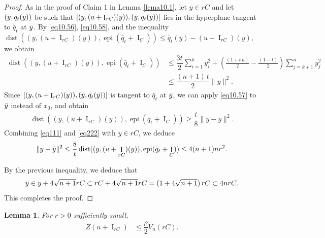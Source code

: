 \documentclass[11pt]{article}
\newtheorem{lema}[teo]{Lemma}
\theoremstyle{definition} %
\DeclareMathOperator{\I}{I}
\DeclareMathOperator{\epi}{epi}
\DeclareMathOperator{\dist}{dist}
\begin{document}
\begin{proof}
As in the proof of Claim 1 in Lemma \ref{lema10.1}, let $y\in rC$ and let $(\Bar{y}, \bar{q}_t(\Bar{y}))$ be such that $[(y,(u+\I_{rC})(y)), (\Bar{y}, \bar{q}_t(\Bar{y}))]$ lies in the hyperplane tangent to $\bar{q}_t$ at $\Bar{y}$. By \eqref{eq10.56}, \eqref{eq10.58}, and the inequality $\dist((y,(u+\I_{rC})(y)), \epi (\bar{q}_t+ \I_C))\leq \bar{q}_t(y)-(u+\I_{rC})(y)$, we obtain 
\begin{align}
 \nonumber\dist((y,(u+\I_{rC})(y)), \epi (\bar{q}_t+ \I_C)) & \leq    \dfrac{3t}{2} \sum_{i=1}^k y_i^2 + \left(\frac{(1+t\, n)}{2}  - \frac{(1-t)}{2}\right)\sum_{j=k+1}^ny_j^2\\
 \label{eq111}& \leq \dfrac{(n+1)\, t}{2}\|y\|^2.
\end{align}
Since $[(y,(u+\I_{rC}) (y)), (\Bar{y}, \bar{q}_t(\Bar{y}))]$ is tangent to $\bar{q}_t$ at $\Bar{y}$, we can apply \eqref{eq10.57} to $\Bar{y}$ instead of $x_0$, and obtain
\begin{align}\label{eq222}
\dist((y,(u+\I_{rC}) (y)), \epi (\bar{q}_t+ \I_C)) \geq \dfrac{t}{8}\|y-\bar{y}\|^2.    
\end{align}
Combining \eqref{eq111} and \eqref{eq222} with $y\in rC$, we deduce
$$\|y-\Bar{y}\|^2\leq \frac{8}{t}\dist((y,(u+\I_{rC})(y)), \epi (\bar{q}_t+ \I_C)) \leq 4(n+1)nr^2.$$


By the previous inequality, we deduce that
\begin{align*}
 \Bar{y}\in y+4\sqrt{n+1}rC \subset rC+4\sqrt{n+1}rC
  = (1+4\sqrt{n+1})\,rC \subset 4nrC.
\end{align*}
This completes the proof.
\end{proof}





\begin{lema} \label{lemaclaim3}
For $r>0$ sufficiently small,
\begin{align*}
 Z(u+\I_{rC})& \leq   \dfrac{\rho }{2}V_n(rC).
\end{align*}
\end{lema}
\end{document}
